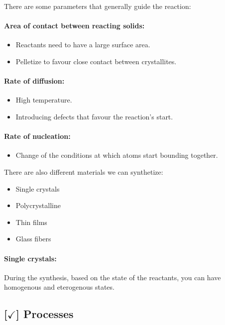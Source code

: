 There are some parameters that generally guide the reaction:

\paragraph{Area of contact between reacting solids: }

\begin{itemize}
    \item Reactants need to have a large surface area.
    \item Pelletize to favour close contact between crystallites.
\end{itemize}

\paragraph{Rate of diffusion: }

\begin{itemize}
    \item High temperature.
    \item Introducing defects that favour the reaction's start.
\end{itemize}

\paragraph{Rate of nucleation: }

\begin{itemize}
    \item Change of the conditions at which atoms start bounding together.
\end{itemize}

There are also different materials we can synthetize:
\begin{itemize}
    \item Single crystals
    \item Polycrystalline
    \item Thin films
    \item Glass fibers
\end{itemize}

\paragraph{Single crystals: }During the synthesis, based on the state of the reactants, you can have homogenous and eterogenous states.

\subsection{[$\checkmark$] Processes}


